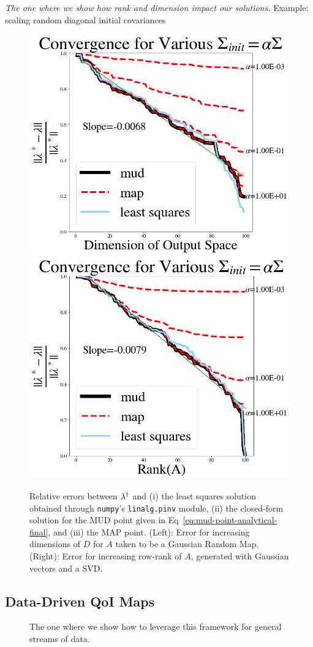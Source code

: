 \begin{frame}[t]{\it The one where we show how rank and dimension impact our solutions.}
\centering
\centering
Example: scaling random diagonal initial covariances

\begin{figure}[htbp]
  \includegraphics[width=0.475\linewidth]{figures/lin/lin-dim-cov-convergence}
  \includegraphics[width=0.475\linewidth]{figures/lin/lin-rank-cov-convergence}
\caption{
	Relative errors between $\lambda^\dagger$ and (i) the least squares solution obtained through {\tt numpy}'s {\tt linalg.pinv} module, (ii) the closed-form solution for the MUD point given in Eq~\eqref{eq:mud-point-analytical-final}, and (iii) the MAP point.
  (Left): Error for increasing dimensions of $D$ for $A$ taken to be a Gaussian Random Map.
  (Right): Error for increasing row-rank of $A$, generated with Gaussian vectors and a SVD.
}
\label{fig:lin-error}
\end{figure}

\end{frame}


\subsection{Data-Driven QoI Maps}

\begin{frame}[t]
\centering
\begin{figure}
\centering

The one where we show how to leverage this framework for general streams of data.

\end{figure}

\end{frame}

